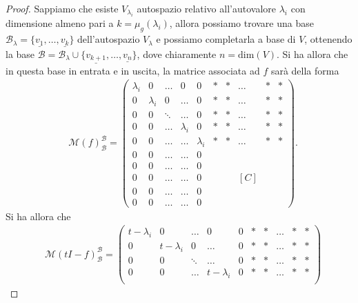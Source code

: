 \begin{proof}
    Sappiamo che esiste $V_{\lambda_i}$ autospazio relativo all'autovalore $\lambda_i$ con dimensione almeno pari a $k = \mu_g(\lambda_i)$, allora possiamo trovare una base $\mathcal{B}_\lambda = \{ \underline{v_1}, \ldots, \underline{v_k} \}$ dell'autospazio $V_\lambda$ e possiamo completarla a base di $V$, ottenendo la base $\mathcal{B} = \mathcal{B}_\lambda \cup \{ \underline{v_{k+1}}, \ldots, \underline{v_n} \}$, dove chiaramente $n = \text{dim}(V)$. Si ha allora che in questa
    base in entrata e in uscita, la matrice associata ad $f$ sarà della forma
    \begin{align}
        &\mathcal{M}(f)^\mathcal{B}_\mathcal{B} = \begin{pmatrix}
            \lambda_i & 0 & \ldots & 0 & 0 & \ast & \ast & \ldots & \ast & \ast \\
            0 & \lambda_i & 0 & \ldots & 0 & \ast & \ast & \ldots & \ast & \ast \\
            0 & 0 & \ddots & \ldots & 0 & \ast & \ast & \ldots & \ast & \ast \\
            0 & 0 & \ldots & \lambda_i & 0 & \ast & \ast & \ldots & \ast & \ast \\
            0 & 0 & \ldots & \ldots & \lambda_i & \ast & \ast & \ldots & \ast & \ast \\
            0 & 0 & \ldots & \ldots & 0 &   &   &   &   & \\
            0 & 0 & \ldots & \ldots & 0 &   &   &   &   & \\
            0 & 0 & \ldots & \ldots & 0 &   &  &[C]   &  & \\
            0 & 0 & \ldots & \ldots & 0 &   &   &   &   & \\
            0 & 0 & \ldots & \ldots & 0 &   &   &   &   & 
        \end{pmatrix}.
    \end{align}
    Si ha allora che
    \begin{align}
        &\mathcal{M}(tI - f)^\mathcal{B}_\mathcal{B} = \begin{pmatrix}
            t-\lambda_i & 0 & \ldots & 0 & 0 & \ast & \ast & \ldots & \ast & \ast \\
            0 & t-\lambda_i & 0 & \ldots & 0 & \ast & \ast & \ldots & \ast & \ast \\
            0 & 0 & \ddots & \ldots & 0 & \ast & \ast & \ldots & \ast & \ast \\
            0 & 0 & \ldots & t-\lambda_i & 0 & \ast & \ast & \ldots & \ast & \ast \\

\end{pmatrix}
\end{align}
\end{proof}
